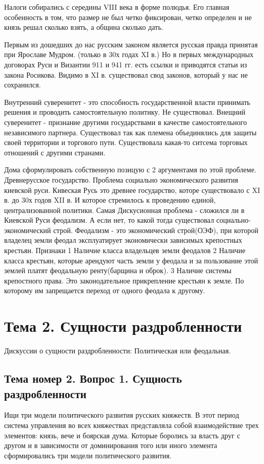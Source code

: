 \documentclass[a4paper]{article}
\begin{document}
Налоги собирались с середины VIII века в форме полюдья. Его главная особенность в том, что размер не был четко фиксирован, четко определен и не князь решал сколько взять, а община сколько дать.

Первым из дошедших до нас русским законом является русская правда принятая при Ярославе Мудром. (только в 30х годах XI в.) Но в первых международных договорах Руси и Византии 911 и 941 гг. есть ссылки и приводятся статьи из закона Росикова. Видимо в XI в. существовал свод законов, который у нас не сохранился.

Внутренний суверенитет - это способность государственной власти принимать решения и проводить самостоятельную политику. Не существовал.
Внещний суверенитет - признание другими государствами в качестве самостоятельного независимого партнера.
Существовал так как племена объединялись для защиты своей территории и торгового пути. Существовала какая-то ситсема торговых отношений с другими странами.

Дома сформулировать собственную позицую с 2 аргументамя по этой проблеме.
Древнерусское государство. Проблема социально экономического развития киевской руси.
Кивеская Русь это древнее государство, которе существовало с XI в. до 30х годов XII в. И которое стремилось к проведению единой, централизованной политики. Самая Дискусионная проблема - сложился ли в Киевской Руси феодализм. А если нет, то какой тогда существовал социально-экономический строй.
Феодализм - это экономический строй(ОЭФ), при которой владелец земли феодал эксплуатирует экономически зависимых крепостных крестьян.
Признаки 
1   Наличие класса владельцев земли феодалов
2   Наличие класса крестьян, которые арендуют часть земли у феодала и за пользование этой землей платят феодальную ренту(барщина и оброк).
3   Наличие системы крепостного права. Это законодательное прикрепление крестьян к земле. По которому им запрещается переход от одного феодала к другому.

\section{Тема 2. Сущности раздробленности}

Дискуссии о сущности раздробленности:
Политическая или феодальная.

 
\subsection{Тема номер 2. Вопрос 1. Сущность раздробленности}
Ищи три модели политического развития русских княжеств.
В этот период система управления во всех княжествах представляла собой взаимодействие трех элементов: князь, вече и боярская дума. Которые боролись за власть друг с другом и в зависимости от доминирования того или иного элемента сформировались три модели политического развития.
\end{document}
